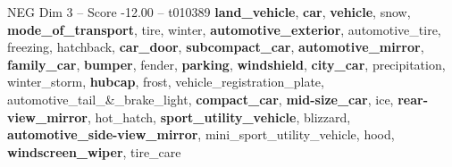 \begin{textsample}{NEG Dim 3 – Score -12.00 – t010389}  \label{ex:f3_neg_004}
\textbf{land\_vehicle}, \textbf{car}, \textbf{vehicle}, snow, \textbf{mode\_of\_transport}, tire, winter, \textbf{automotive\_exterior}, automotive\_tire, freezing, hatchback, \textbf{car\_door}, \textbf{subcompact\_car}, \textbf{automotive\_mirror}, \textbf{family\_car}, \textbf{bumper}, fender, \textbf{parking}, \textbf{windshield}, \textbf{city\_car}, precipitation, winter\_storm, \textbf{hubcap}, frost, vehicle\_registration\_plate, automotive\_tail\_\&\_brake\_light, \textbf{compact\_car}, \textbf{mid-size\_car}, ice, \textbf{rear-view\_mirror}, hot\_hatch, \textbf{sport\_utility\_vehicle}, blizzard, \textbf{automotive\_side-view\_mirror}, mini\_sport\_utility\_vehicle, hood, \textbf{windscreen\_wiper}, tire\_care

\end{textsample}
